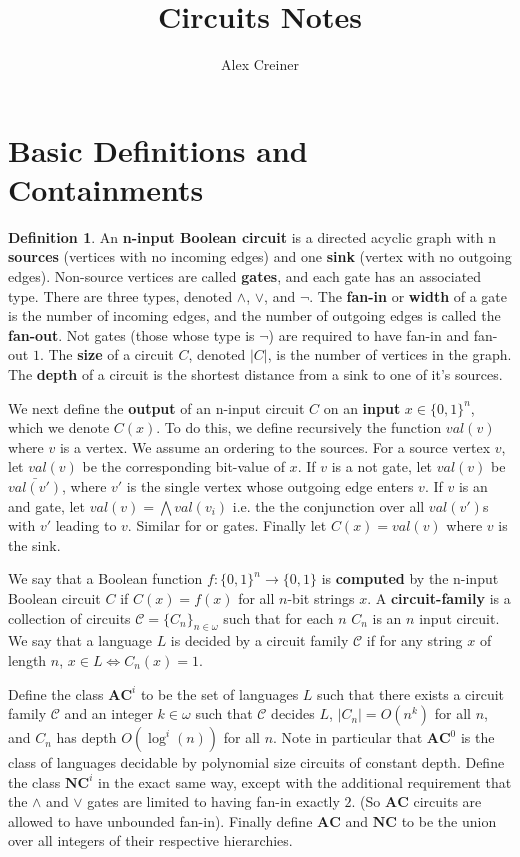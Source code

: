 \documentclass{article}
\title{Circuits Notes}
\author{Alex Creiner}
\theoremstyle{definition}
\newtheorem{definition}{Definition}[section]
\theoremstyle{plain}
\theoremstyle{theorem}
\begin{document}
\maketitle
\section{Basic Definitions and Containments}
\begin{definition}
	An \textbf{n-input Boolean circuit} is a directed acyclic graph with n \textbf{sources} (vertices with no incoming edges) and one \textbf{sink} (vertex with no outgoing edges). Non-source vertices are called \textbf{gates}, and each gate has an associated type. There are three types, denoted $\wedge$, $\vee$, and $\neg$. The \textbf{fan-in} or \textbf{width} of a gate is the number of incoming edges, and the number of outgoing edges is called the \textbf{fan-out}. Not gates (those whose type is $\neg$) are required to have fan-in and fan-out $1$. The \textbf{size} of a circuit $C$, denoted $|C|$, is the number of vertices in the graph. The \textbf{depth} of a circuit is the shortest distance from a sink to one of it's sources. \par 
	We next define the \textbf{output} of an  n-input circuit $C$ on an \textbf{input} $x \in \{0,1\}^n$, which we denote $C(x)$. To do this, we define recursively the function $val(v)$ where $v$ is a vertex. We assume an ordering to the sources. For a source vertex $v$, let $val(v)$ be the corresponding bit-value of $x$. If $v$ is a not gate, let $val(v)$ be $\bar{val(v')}$, where $v'$ is the single vertex whose outgoing edge enters $v$. If $v$ is an and gate, let $val(v) = \bigwedge val(v_i)$ i.e. the the conjunction over all $val(v')$s with $v'$ leading to $v$. Similar for or gates. Finally let $C(x) = val(v)$ where $v$ is the sink. \par 
	We say that a Boolean function $f:\{0,1\}^n \to \{0,1\}$ is \textbf{computed} by the n-input Boolean circuit $C$ if $C(x) = f(x)$ for all $n$-bit strings $x$. A \textbf{circuit-family} is a collection of circuits $\mathcal{C} = \{C_n\}_{n \in \omega}$ such that for each $n$ $C_n$ is an $n$ input circuit. We say that a language $L$ is decided by a circuit family $\mathcal{C}$ if for any string $x$ of length $n$, $x \in L \iff C_n(x) = 1$. \par 
	Define the class $\bm{AC}^i$ to be the set of languages $L$ such that there exists a circuit family $\mathcal{C}$ and an integer $k \in \omega$ such that $\mathcal{C}$ decides $L$, $|C_n| = O(n^k)$ for all $n$, and $C_n$ has depth $O(\log^i(n))$ for all $n$. Note in particular that $\bm{AC}^0$ is the class of languages decidable by polynomial size circuits of constant depth. Define the class $\bm{NC}^i$ in the exact same way, except with the additional requirement that the $\wedge$ and $\vee$ gates are limited to having fan-in exactly $2$. (So $\bm{AC}$ circuits are allowed to have unbounded fan-in). Finally define $\bm{AC}$ and $\bm{NC}$ to be the union over all integers of their respective hierarchies. 
\end{definition}
\end{document}
